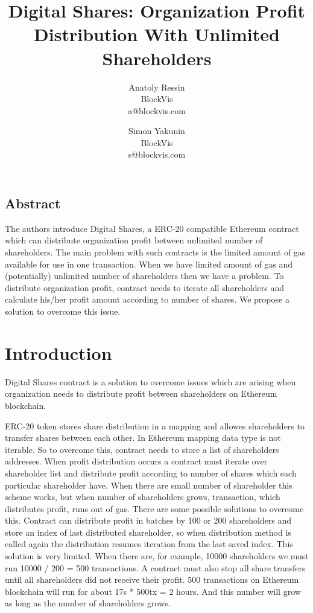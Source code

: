 \documentclass[onecolumn]{article}
\begin{document}
\title{Digital Shares: Organization Profit Distribution With Unlimited Shareholders}

\author{
{\rm Anatoly Ressin}\\
BlockVis\\
a@blockvis.com
\and
{\rm Simon Yakunin}\\
BlockVis\\
s@blockvis.com
}

\maketitle

\subsection*{Abstract}
The authors introduce Digital Shares, a ERC-20 compatible Ethereum contract which can distribute organization profit between unlimited number of shareholders. The main problem with such contracts is the limited amount of gas available for use in one transaction. When we have limited amount of gas and (potentially) unlimited number of shareholders then we have a problem. To distribute organization profit, contract needs to iterate all shareholders and calculate his/her profit amount according to number of shares. We propose a solution to overcome this issue.

\section{Introduction}
Digital Shares contract is a solution to overcome issues which are arising when organization needs to distribute profit between shareholders on Ethereum blockchain.

ERC-20 token stores share distribution in a mapping and allowes shareholders to transfer shares between each other. In Ethereum mapping data type is not iterable. So to overcome this, contract needs to store a list of shareholders addresses. When profit distribution occurs a contract must iterate over shareholder list and distribute profit according to number of shares which each particular shareholder have. When there are small number of shareholder this scheme works, but when number of shareholders grows, transaction, which distributes profit, runs out of gas. There are some possible solutions to overcome this. Contract can distribute profit in batches by 100 or 200 shareholders and store an index of last distributed shareholder, so when distribution method is called again the distribution resumes iteration from the last saved index. This solution is very limited. When there are, for example, 10000 shareholders we must run 10000 / 200 = 500 transactions. A contract must also stop all share transfers until all shareholders did not receive their profit. 500 transactions on Ethereum blockchain will run for about 17s * 500tx = 2 hours. And this number will grow as long as the number of shareholders grows.
\end{document}
